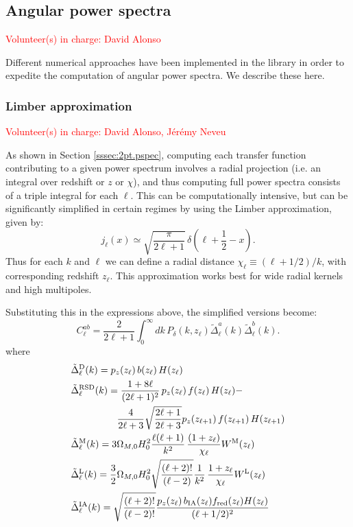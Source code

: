 \documentclass[\docopts]{\docclass}
\newcommand{\vol}[1]{\textcolor{red}{Volunteer(s) in charge: #1}}
\begin{document}
\subsection{Angular power spectra}
\vol{David Alonso}

Different numerical approaches have been implemented in the library in order to expedite the computation of angular power spectra. We describe these here.

\subsubsection{Limber approximation}
\vol{David Alonso, J\'er\'emy Neveu}

As shown in Section \ref{sssec:2pt.pspec}, computing each transfer function contributing to a given power spectrum involves a radial projection (i.e. an integral over redshift or $z$ or $\chi$), and thus computing full power spectra consists of a triple integral for each $\ell$. This can be computationally intensive, but can be significantly simplified in certain regimes by using the Limber approximation, given by:
\begin{equation}
 j_\ell(x)\simeq\sqrt{\frac{\pi}{2\ell+1}}\,\delta\left(\ell+\frac{1}{2}-x\right).
\end{equation}
Thus for each $k$ and $\ell$ we can define a radial distance $\chi_\ell\equiv(\ell+1/2)/k$, with corresponding redshift $z_\ell$. This approximation works best for wide radial kernels and high multipoles.

Substituting this in the expressions above, the simplified versions become:
\begin{equation}\label{eq:limber}
 C^{ab}_\ell=\frac{2}{2\ell+1}\int_0^\infty dk\,P_\delta\left(k,z_\ell\right)
 \tilde{\Delta}^a_\ell(k)\tilde{\Delta}^b_\ell(k).
\end{equation}
where
\begin{align}
 &\tilde{\Delta}_\ell^{\rm D}(k)=p_z(z_\ell)\,b(z_\ell)\,H(z_\ell)\\
 &\tilde{\Delta}_\ell^{\rm RSD}(k)=
 \frac{1+8\ell}{(2\ell+1)^2}\,p_z(z_\ell)\,f(z_\ell)\,H(z_\ell)-\\
 &\hspace{48pt}\frac{4}{2\ell+3}\sqrt{\frac{2\ell+1}{2\ell+3}}p_z(z_{\ell+1})\,f(z_{\ell+1})\,H(z_{\ell+1})\\
 &\tilde{\Delta}_\ell^{\rm M}(k)=3\Omega_{M,0}H_0^2\frac{\ell(\ell+1)}{k^2}\,
 \frac{(1+z_\ell)}{\chi_\ell}W^{\rm M}(z_\ell)\\
 &\tilde{\Delta}_\ell^{\rm L}(k)=\frac{3}{2}\Omega_{M,0}H_0^2\sqrt{\frac{(\ell+2)!}{(\ell-2)}}\frac{1}{k^2}\,
 \frac{1+z_\ell}{\chi_\ell}W^{\rm L}(z_\ell)\\
 &\tilde{\Delta}_\ell^{\rm IA}(k)=\sqrt{\frac{(\ell+2)!}{(\ell-2)!}}\frac{p_z(z_\ell)\,b_{\rm IA}(z_\ell)f_{\rm red}(z_\ell)H(z_\ell)}{(\ell+1/2)^2}
\end{align}
\end{document}
